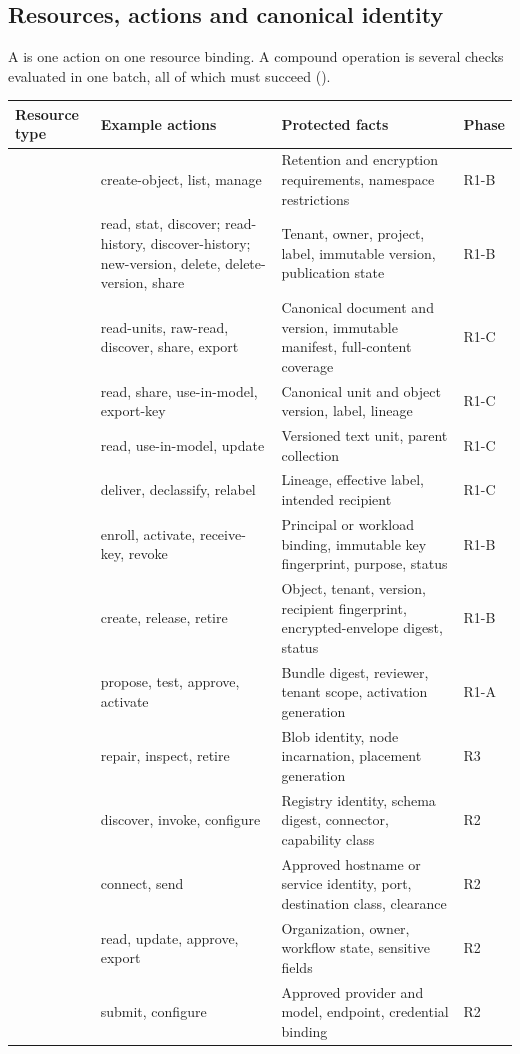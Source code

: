 \subsection{Resources, actions and canonical identity}
A  is one action on one resource binding. A compound operation is several checks evaluated in one batch, all of which must succeed ().
\begin{longtable}{@{}P{0.25\textwidth}P{0.25\textwidth}P{0.31\textwidth}P{0.08\textwidth}@{}}
\toprule Resource type & Example actions & Protected facts & Phase\\\midrule\endhead
{} & create-object, list, manage & Retention and encryption requirements, namespace restrictions & R1-B\\
 & read, stat, discover; read-history, discover-history; new-version, delete, delete-version, share & Tenant, owner, project, label, immutable version, publication state & R1-B\\
 & read-units, raw-read, discover, share, export & Canonical document and version, immutable manifest, full-content coverage & R1-C\\
 & read, share, use-in-model, export-key & Canonical unit and object version, label, lineage & R1-C\\
 & read, use-in-model, update & Versioned text unit, parent collection & R1-C\\
 & deliver, declassify, relabel & Lineage, effective label, intended recipient & R1-C\\
 & enroll, activate, receive-key, revoke & Principal or workload binding, immutable key fingerprint, purpose, status & R1-B\\
 & create, release, retire & Object, tenant, version, recipient fingerprint, encrypted-envelope digest, status & R1-B\\
 & propose, test, approve, activate & Bundle digest, reviewer, tenant scope, activation generation & R1-A\\
 & repair, inspect, retire & Blob identity, node incarnation, placement generation & R3\\
 & discover, invoke, configure & Registry identity, schema digest, connector, capability class & R2\\
 & connect, send & Approved hostname or service identity, port, destination class, clearance & R2\\
 & read, update, approve, export & Organization, owner, workflow state, sensitive fields & R2\\
 & submit, configure & Approved provider and model, endpoint, credential binding & R2\\
\bottomrule
\end{longtable}
